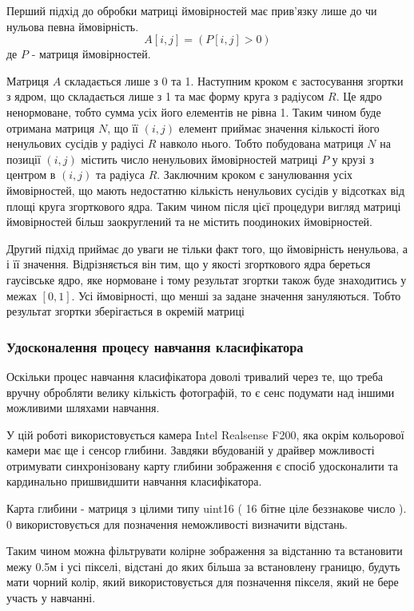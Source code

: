 Перший підхід до обробки матриці ймовірностей має прив'язку лише до чи нульова певна ймовірність.
\begin{equation}
	A[i,j] = ( P[i,j] > 0 )
\end{equation}
де $P$ - матриця ймовірностей.

Матриця $A$ складається лише з 0 та 1. Наступним кроком є застосування згортки з ядром, що складається лише з 1 та має форму круга з радіусом $R$. Це ядро ненормоване, тобто сумма усіх його елементів не рівна 1. Таким чином буде отримана матриця $N$, що її $(i,j)$ елемент приймає значення кількості його ненульових сусідів у радіусі $R$ навколо нього. Тобто побудована матриця $N$ на позиції $(i,j)$ містить число ненульових ймовірностей матриці $P$ у крузі з центром в $(i,j)$ та радіуса $R$. Заключним кроком є занулювання усіх ймовірностей, що мають недостатню кількість ненульових сусідів у відсотках від площі круга згорткового ядра. Таким чином після цієї процедури вигляд матриці ймовірностей більш заокруглений та не містить поодиноких ймовірностей.

Другий підхід приймає до уваги не тільки факт того, що ймовірність ненульова, а і її значення.
Відрізняється він тим, що у якості згорткового ядра береться гаусівське ядро, яке нормоване і тому результат згортки також буде знаходитись у межах $[0,1]$. Усі ймовірності, що менші за задане значення зануляються. Тобто результат згортки зберігається в окремій матриці
\subsubsection{Удосконалення процесу навчання класифікатора}

Оскільки процес навчання класифікатора доволі тривалий через те, що треба вручну обробляти велику кількість фотографій, то є сенс подумати над іншими можливими шляхами навчання.

У цій роботі використовується камера Intel Realsense F200, яка окрім кольорової камери має ще і сенсор глибини. Завдяки вбудованій у драйвер можливості отримувати синхронізовану карту глибини зображення є спосіб удосконалити та кардинально пришвидшити навчання класифікатора.

Карта глибини - матриця з цілими типу uint16 ( 16 бітне ціле беззнакове число ). 0 використовується для позначення неможливості визначити відстань.

Таким чином можна фільтрувати колірне зображення за відстанню та встановити межу 0.5м і усі пікселі, відстані до яких більша за встановлену границю, будуть мати чорний колір, який використовується для позначення пікселя, який не бере участь у навчанні.

